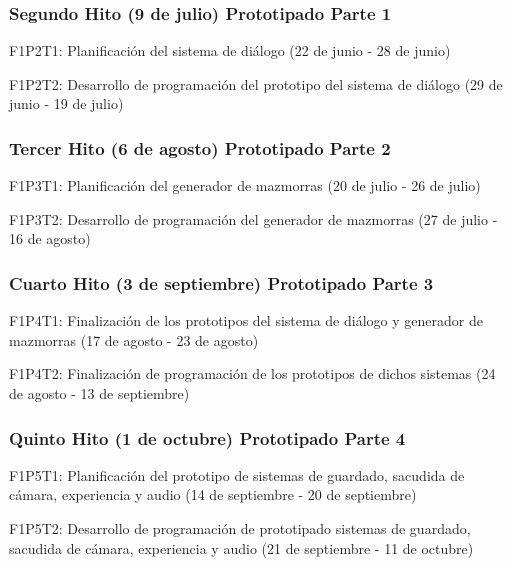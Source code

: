 \subsubsection{Segundo Hito (9 de julio) Prototipado Parte 1}

\begin{compactitem}
  \item F1P2T1: Planificación del sistema de diálogo (22 de junio - 28 de junio)
  \item F1P2T2: Desarrollo de programación del prototipo del sistema de diálogo (29 de junio - 19 de julio)
\end{compactitem}

\subsubsection{Tercer Hito (6 de agosto) Prototipado Parte 2}

\begin{compactitem}
  \item F1P3T1: Planificación del generador de mazmorras (20 de julio - 26 de julio)
  \item F1P3T2: Desarrollo de programación del generador de mazmorras (27 de julio - 16 de agosto)
\end{compactitem}

\subsubsection{Cuarto Hito (3 de septiembre) Prototipado Parte 3}

\begin{compactitem}
\item F1P4T1: Finalización de los prototipos del sistema de diálogo y generador de mazmorras (17 de agosto - 23 de agosto)
\item F1P4T2: Finalización de programación de los prototipos de dichos sistemas (24 de agosto - 13 de septiembre)
\end{compactitem}

\subsubsection{Quinto Hito (1 de octubre) Prototipado Parte 4}

\begin{compactitem}
\item F1P5T1: Planificación del prototipo de sistemas de guardado, sacudida de cámara, experiencia y audio (14 de septiembre - 20 de septiembre)
\item F1P5T2: Desarrollo de programación de prototipado sistemas de guardado, sacudida de cámara, experiencia y audio (21 de septiembre - 11 de octubre)
\end{compactitem}

